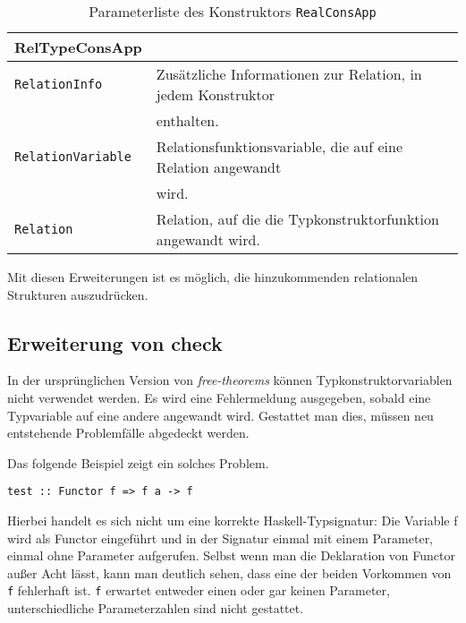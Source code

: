 \begin{table}[th]
\begin{tabular}{ | l | l | }
\hline
RelTypeConsApp & \\
\hline
\texttt{RelationInfo} & Zusätzliche Informationen zur Relation, in jedem Konstruktor \\
& enthalten. \\
\texttt{RelationVariable} & Relationsfunktionsvariable, die auf eine Relation angewandt\\
& wird. \\
\texttt{Relation} & Relation, auf die die Typkonstruktorfunktion angewandt wird. \\
\hline
\end{tabular}
\caption{Parameterliste des Konstruktors \texttt{RealConsApp}}
\label{tab:reltypeconsapp}
\end{table}

Mit diesen Erweiterungen ist es möglich, die hinzukommenden relationalen Strukturen auszudrücken.


\subsection{Erweiterung von check}


In der ursprünglichen Version von \textit{free-theorems} können Typkonstruktorvariablen nicht verwendet werden. Es wird eine
Fehlermeldung ausgegeben, sobald eine Typvariable auf eine andere angewandt wird. Gestattet man dies, müssen neu
entstehende Problemfälle abgedeckt werden.

Das folgende Beispiel zeigt ein solches Problem.

\begin{verbatim}
test :: Functor f => f a -> f
\end{verbatim}

Hierbei handelt es sich nicht um eine korrekte Haskell-Typsignatur: Die Variable f wird als Functor eingeführt und in der Signatur
einmal mit einem Parameter, einmal ohne Parameter aufgerufen. Selbst wenn man die Deklaration von Functor außer Acht lässt,
kann man deutlich sehen, dass eine der beiden Vorkommen von \texttt{f} fehlerhaft ist. \texttt{f} erwartet entweder einen
oder gar keinen Parameter, unterschiedliche Parameterzahlen sind nicht gestattet.

